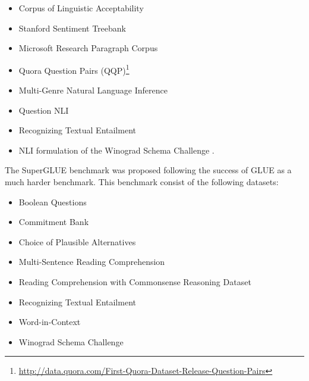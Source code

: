 \documentclass[letterpaper, 12pt]{report}
\begin{document}
\begin{itemize}
  \item Corpus of Linguistic Acceptability \citep[CoLA,][]{cola_warstadt2019neural}
  \item Stanford Sentiment Treebank \citep[SST,][]{sst2_socher2013recursive}
  \item  Microsoft Research Paragraph Corpus \citep[MRPC,][]{mrpc_dolan2005automatically}
  \item Quora Question Pairs (QQP)\footnote{\href{http://data.quora.com/First-Quora-Dataset-Release-Question-Pairs}{http://data.quora.com/First-Quora-Dataset-Release-Question-Pairs}}
  \item Multi-Genre Natural Language Inference \citep[MNLI,][]{williams-etal-2018-broad}
  \item Question NLI \citep[QNLI,][]{rajpurkar-etal-2016-squad, qnli_2_demszky2018transforming}
  \item Recognizing Textual Entailment \citep[RTE,][]{rte1_dagan2005pascal, rte2_haim2006second, rte3_giampiccolo2007third, rte5_bentivogli2009fifth}
  \item NLI formulation of the Winograd Schema Challenge \citep[WNLI,][]{Levesque2011:WSC}.
\end{itemize}

\noindent The SuperGLUE benchmark \citep{wang-etal-2019-superglue} was proposed following the success of GLUE as a much harder benchmark. This benchmark consist of the following datasets:

\begin{itemize}
  \item Boolean Questions \citep[BoolQ,][]{clark-etal-2019-boolq}
  \item Commitment Bank \citep[CB,][]{de2019commitmentbank}
  \item Choice of Plausible Alternatives \citep[COPA,][]{roemmele2011choice}
  \item Multi-Sentence Reading Comprehension \citep[MultiRC,][]{khashabi-etal-2018-looking}
  \item Reading Comprehension with Commonsense Reasoning Dataset \citep[ReCoRD,][]{zhang2018record}
  \item Recognizing Textual Entailment \citep[RTE,][]{rte1_dagan2005pascal, rte2_haim2006second, rte3_giampiccolo2007third, rte5_bentivogli2009fifth}
  \item Word-in-Context \citep[WiC,][]{pilehvar-camacho-collados-2019-wic}
  \item Winograd Schema Challenge \citep[WSC,][]{Levesque2011:WSC}
\end{itemize}
\end{document}
